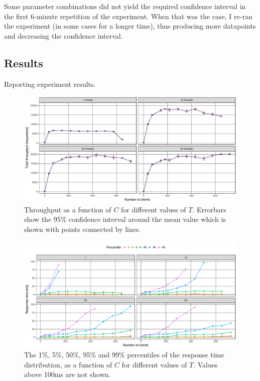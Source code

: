 \documentclass[11pt]{article}
\begin{document}
Some parameter combinations did not yield the required confidence interval in the first 6-minute repetition of the experiment. When that was the case, I re-ran the experiment (in some cases for a longer time), thus producing more datapoints and decreasing the confidence interval.

\subsection{Results}
Reporting experiment results.

\begin{figure}[h]
\centering
\includegraphics[width=\textwidth]{../results/throughput/graphs/tp_vs_clients.pdf}
\caption{Throughput as a function of $C$ for different values of $T$. Errorbars show the 95\% confidence interval around the mean value which is shown with points connected by lines.}
\label{fig:exp1:res:throughput}
\end{figure}

\begin{figure}[h]
\centering
\includegraphics[width=\textwidth]{../results/throughput/graphs/response_time_vs_clients.pdf}
\caption{The 1\%, 5\%, 50\%, 95\% and 99\% percentiles of the response time distribution, as a function of $C$ for different values of $T$. Values above 100ms are not shown.}
\label{fig:exp1:res:responsetime}
\end{figure}
\end{document}
